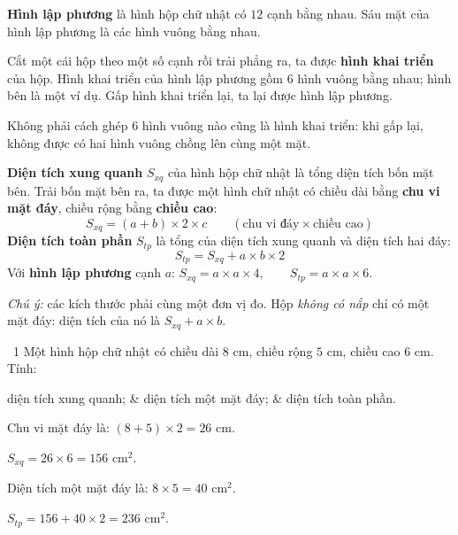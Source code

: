 \begin{knowbox}
\begin{minipage}[t]{0.56\linewidth}
\textbf{Hình lập phương} là hình hộp chữ nhật có $12$ cạnh bằng nhau. Sáu mặt của hình lập phương là các hình vuông bằng nhau.\par
\smallskip
Cắt một cái hộp theo một số cạnh rồi trải phẳng ra, ta được \textbf{hình khai triển} của hộp. Hình khai triển của hình lập phương gồm $6$ hình vuông bằng nhau; hình bên là một ví dụ. Gấp hình khai triển lại, ta lại được hình lập phương.\par
\smallskip
Không phải cách ghép $6$ hình vuông nào cũng là hình khai triển: khi gấp lại, không được có hai hình vuông chồng lên cùng một mặt.
\end{minipage}\hfill
\begin{minipage}[t]{0.4\linewidth}\vspace{2pt}\centering
{}\qquad
{}
\end{minipage}
\end{knowbox}
\begin{knowbox}
\textbf{Diện tích xung quanh} $S_{xq}$ của hình hộp chữ nhật là tổng diện tích bốn mặt bên. Trải bốn mặt bên ra, ta được một hình chữ nhật có chiều dài bằng \textbf{chu vi mặt đáy}, chiều rộng bằng \textbf{chiều cao}:
\[S_{xq}=(a+b)\times2\times c\qquad(\text{chu vi đáy}\times\text{chiều cao})\]
\textbf{Diện tích toàn phần} $S_{tp}$ là tổng của diện tích xung quanh và diện tích hai đáy:
\[S_{tp}=S_{xq}+a\times b\times2\]
Với \textbf{hình lập phương} cạnh $a$: \quad $S_{xq}=a\times a\times4,\qquad S_{tp}=a\times a\times6.$\par
\smallskip
\emph{Chú ý:} các kích thước phải cùng một đơn vị đo. Hộp \emph{không có nắp} chỉ có một mặt đáy: diện tích của nó là $S_{xq}+a\times b$.
\end{knowbox}
\gap
\begin{exbox}{\ExWord\ 1}
Một hình hộp chữ nhật có chiều dài $8$ cm, chiều rộng $5$ cm, chiều cao $6$ cm. Tính:
\begin{cols3}
 diện tích xung quanh; &  diện tích một mặt đáy; &  diện tích toàn phần.
\end{cols3}
\guide
{} Chu vi mặt đáy là: $(8+5)\times2=26$ cm.\par $S_{xq}=26\times6=156$ cm$^2$.\par
{} Diện tích một mặt đáy là: $8\times5=40$ cm$^2$.\par
{} $S_{tp}=156+40\times2=236$ cm$^2$.
\end{exbox}
